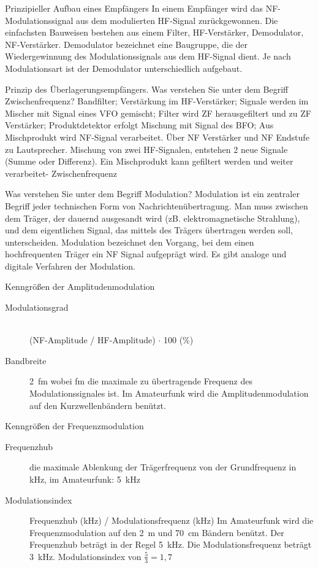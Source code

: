 \documentclass[avery5371,grid,frame,a4paper]{flashcards}
\newcommand{\card}[3]{
  \begin{flashcard}[{\chap} -- #1]{#2}#3\end{flashcard}
}
\begin{document}
\card{13}{Prinzipieller Aufbau eines Empfängers}{
  In einem Empfänger wird das NF-Modulationssignal aus dem modulierten HF-Signal zurückgewonnen.
  Die einfachsten Bauweisen bestehen aus einem Filter, HF-Verstärker, Demodulator, NF-Verstärker.
  Demodulator bezeichnet eine Baugruppe, die der Wiedergewinnung des Modulationssignals aus dem HF-Signal dient. Je nach Modulationsart ist der Demodulator unterschiedlich aufgebaut.
}
\card{14}{Prinzip des Überlagerungsempfängers. Was verstehen Sie unter dem Begriff Zwischenfrequenz?}{
  Bandfilter; Verstärkung im HF-Verstärker; Signale werden im Mischer mit Signal eines VFO gemischt; Filter wird ZF herausgefiltert und zu ZF Verstärker; Produktdetektor erfolgt Mischung mit Signal des BFO; Aus Mischprodukt wird NF-Signal verarbeitet. Über NF Verstärker und NF Endstufe zu Lautsprecher.
  Mischung von zwei HF-Signalen, entstehen 2 neue Signale (Summe oder Differenz). Ein Mischprodukt kann gefiltert werden und weiter verarbeitet- Zwischenfrequenz} %
\card{16}{Was verstehen Sie unter dem Begriff Modulation?}{
  Modulation ist ein zentraler Begriff jeder technischen Form von Nachrichtenübertragung. Man muss zwischen dem Träger, der dauernd ausgesandt wird (zB. elektromagnetische Strahlung), und dem eigentlichen Signal, das mittels des Trägers übertragen werden soll, unterscheiden. Modulation bezeichnet den Vorgang, bei dem einen hochfrequenten Träger ein NF Signal aufgeprägt wird. Es gibt analoge und digitale Verfahren der Modulation.}
\card{17}{Kenngrößen der Amplitudenmodulation}{
  \begin{description}
    \item[Modulationsgrad] \hfill{} \\ (NF-Amplitude / HF-Amplitude) $\cdot$ 100 (\%)
    \item[Bandbreite]
      2~fm wobei fm die maximale zu übertragende Frequenz des Modulationssignales ist.
      Im Amateurfunk wird die Amplitudenmodulation auf den Kurzwellenbändern benützt.
  \end{description}
}
\card{18}{Kenngrößen der Frequenzmodulation}{
  \begin{description}
    \item[Frequenzhub] die maximale Ablenkung der Trägerfrequenz von der Grundfrequenz in kHz,
      im Amateurfunk: 5~kHz
    \item[Modulationsindex]
      Frequenzhub (kHz) / Modulationsfrequenz (kHz)
      Im Amateurfunk wird die Frequenzmodulation auf den 2~m und \SI{70}{\centi\metre} Bändern benützt.
      Der Frequenzhub beträgt in der Regel 5~kHz. Die Modulationsfrequenz beträgt 3~kHz.
      Modulationsindex von $\frac53 = 1,7$
  \end{description}
}
\end{document}
